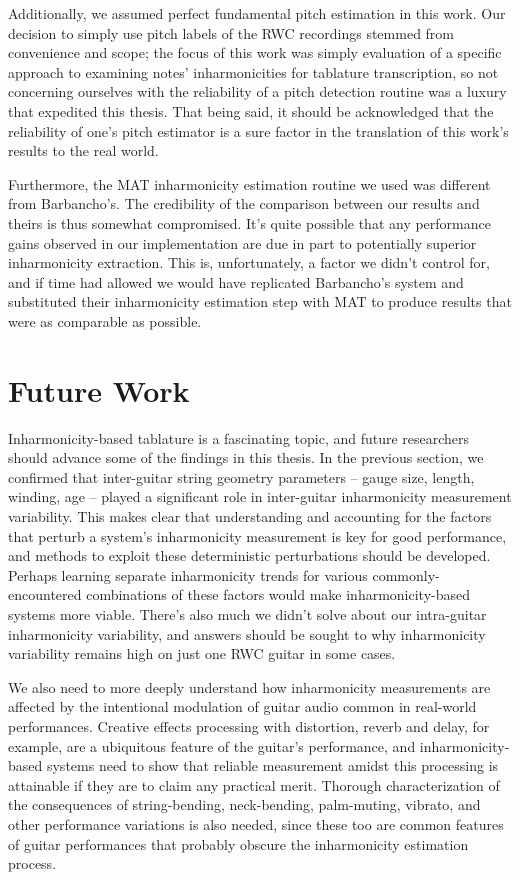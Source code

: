 \documentclass[12pt]{cmuthesis}
\begin{document}
Additionally, we assumed perfect fundamental pitch estimation in this work. Our decision to simply use pitch labels of the RWC recordings stemmed from convenience and scope; the focus of this work was simply evaluation of a specific approach to examining notes' inharmonicities for tablature transcription, so not concerning ourselves with the reliability of a pitch detection routine was a luxury that expedited this thesis. That being said, it should be acknowledged that the reliability of one's pitch estimator is a sure factor in the translation of this work's results to the real world.

Furthermore, the MAT inharmonicity estimation routine we used was different from Barbancho's. The credibility of the comparison between our results and theirs is thus somewhat compromised. It's quite possible that any performance gains observed in our implementation are due in part to potentially superior inharmonicity extraction. This is, unfortunately, a factor we didn't control for, and if time had allowed we would have replicated Barbancho's system and substituted their inharmonicity estimation step with MAT to produce results that were as comparable as possible.

\section{Future Work}
Inharmonicity-based tablature is a fascinating topic, and future researchers should advance some of the findings in this thesis. In the previous section, we confirmed that inter-guitar string geometry parameters -- gauge size, length, winding, age -- played a significant role in inter-guitar inharmonicity measurement variability. This makes clear that understanding and accounting for the factors that perturb a system's inharmonicity measurement is key for good performance, and methods to exploit these deterministic perturbations should be developed. Perhaps learning separate inharmonicity trends for various commonly-encountered combinations of these factors would make inharmonicity-based systems more viable. There's also much we didn't solve about our intra-guitar inharmonicity variability, and answers should be sought to why inharmonicity variability remains high on just one RWC guitar in some cases.

We also need to more deeply understand how inharmonicity measurements are affected by the intentional modulation of guitar audio common in real-world performances. Creative effects processing with distortion, reverb and delay, for example, are a ubiquitous feature of the guitar's performance, and inharmonicity-based systems need to show that reliable measurement amidst this processing is attainable if they are to claim any practical merit. Thorough characterization of the consequences of string-bending, neck-bending, palm-muting, vibrato, and other performance variations is also needed, since these too are common features of guitar performances that probably obscure the inharmonicity estimation process.
\end{document}
